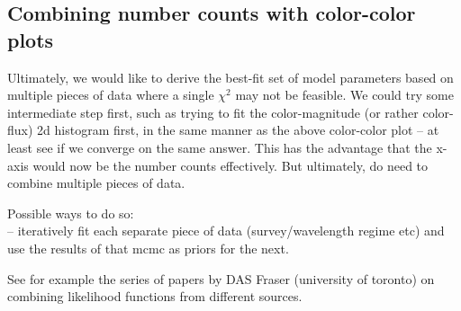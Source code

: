 \documentclass{emulateapj}
\begin{document}
\subsection{Combining number counts with color-color plots}

Ultimately, we would like to derive the best-fit set of model parameters based on multiple pieces of data where a single $\chi^2$ may not be feasible. We could try some intermediate step first, such as trying to fit the color-magnitude (or rather color-flux) 2d histogram first, in the same manner as the above color-color plot -- at least see if we converge on the same answer. This has the advantage that the x-axis would now be the number counts effectively. But ultimately, do need to combine multiple pieces of data. 

Possible ways to do so:\\

-- iteratively fit each separate piece of data (survey/wavelength regime etc) and use the results of that mcmc as priors for the next. 

See for example the series of papers by DAS Fraser (university of toronto) on combining likelihood functions from different sources. 



\end{document}
